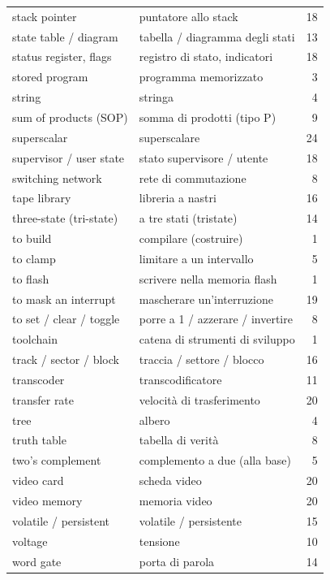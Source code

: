 {\begin{longtable}{@{}p{}p{}r@{}}
stack pointer & puntatore allo stack & 18\\
state table / diagram & tabella / diagramma degli stati & 13\\
status register, flags & registro di stato, indicatori & 18\\
stored program & programma memorizzato & 3\\
string & stringa & 4\\
sum of products (SOP) & somma di prodotti (tipo P) & 9\\
superscalar & superscalare & 24\\
supervisor / user state & stato supervisore / utente & 18\\
switching network & rete di commutazione & 8\\
tape library & libreria a nastri & 16\\
three-state (tri-state) & a tre stati (tristate) & 14\\
to build & compilare (costruire) & 1\\
to clamp & limitare a un intervallo & 5\\
to flash & scrivere nella memoria flash & 1\\
to mask an interrupt & mascherare un'interruzione & 19\\
to set / clear / toggle & porre a 1 / azzerare / invertire & 8\\
toolchain & catena di strumenti di sviluppo & 1\\
track / sector / block & traccia / settore / blocco & 16\\
transcoder & transcodificatore & 11\\
transfer rate & velocità di trasferimento & 20\\
tree & albero & 4\\
truth table & tabella di verità & 8\\
two's complement & complemento a due (alla base) & 5\\
video card & scheda video & 20\\
video memory & memoria video & 20\\
volatile / persistent & volatile / persistente & 15\\
voltage & tensione & 10\\
word gate & porta di parola & 14\\
\end{longtable}}

